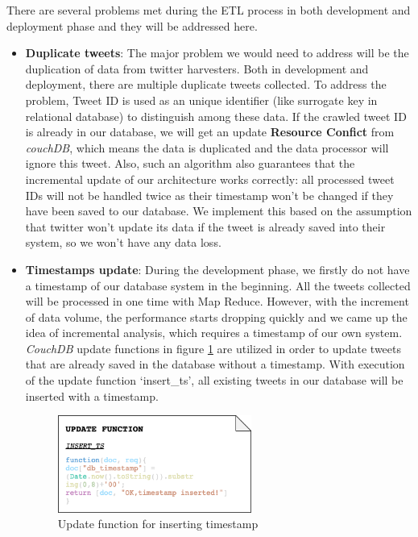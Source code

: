 \documentclass{article}
\begin{document}
There are several problems met during the ETL process in both development and deployment phase and they will be addressed here.
\begin{itemize}
    \item \textbf{Duplicate tweets}: The major problem we would need to address will be the duplication of data from twitter harvesters. Both in development and deployment, there are multiple duplicate tweets collected. To address the problem, Tweet ID is used as an unique identifier (like surrogate key in relational database) to distinguish among these data. If the crawled tweet ID is already in our database, we will get an update \textbf{Resource Confict} from \textit{couchDB}, which means the data is duplicated and the data processor will ignore this tweet. Also, such an algorithm also guarantees that the incremental update of our architecture works correctly: all processed tweet IDs will not be handled twice as their timestamp won’t be changed if they have been saved to our database. We implement this based on the assumption that twitter won’t update its data if the tweet is already saved into their system, so we won’t have any data loss.

    \item \textbf{Timestamps update}: During the development phase, we firstly do not have a timestamp of our database system in the beginning. All the tweets collected will be processed in one time with Map Reduce. However, with the increment of data volume, the performance starts dropping quickly and we came up the idea of incremental analysis, which requires a timestamp of our own system. \textit{CouchDB} update functions in figure \ref{fig:insertts} are utilized in order to update tweets that are already saved in the database without a timestamp. With execution of the update function ‘insert\_ts’, all existing tweets in our database will be inserted with a timestamp.
\begin{figure}
\centering
\includegraphics[width=0.6\textwidth]{img/insert_ts.png}
\caption{Update function for inserting timestamp}
\label{fig:insertts}
\end{figure}
\end{itemize}
\end{document}
